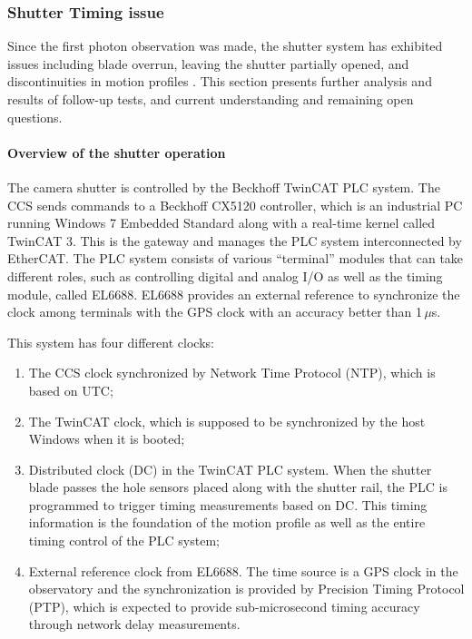 
\subsubsection{Shutter Timing issue}
\label{sec:shutter-timing}
Since the first photon observation was made, the shutter system has exhibited issues including blade overrun, leaving the shutter partially opened, and discontinuities in motion profiles \citep{CTN-003}. This section presents  further analysis and results of follow-up tests, and current understanding and remaining open questions.

\paragraph{Overview of the shutter operation}
The camera shutter is controlled by the Beckhoff TwinCAT PLC system. The CCS sends commands to a Beckhoff CX5120 controller, which is an industrial PC running Windows 7 Embedded Standard along with a real-time kernel called TwinCAT 3. This is the gateway and manages the PLC system interconnected by EtherCAT. The PLC system consists of various ``terminal'' modules that can take different roles, such as controlling digital and analog I/O as well as the timing module, called EL6688. EL6688 provides an external reference to synchronize the clock among terminals with the GPS clock with an accuracy better than 1\,$\mu$s. 

This system has four different clocks: 
\begin{enumerate}
    \item The CCS clock synchronized by Network Time Protocol (NTP), which is based on UTC;
    \item The TwinCAT clock, which is supposed to be synchronized by the host Windows when it is booted;
    \item Distributed clock (DC) in the TwinCAT PLC system. When the shutter blade passes the hole sensors placed along with the shutter rail, the PLC is programmed to trigger timing measurements based on DC. This timing information is the foundation of the motion profile as well as the entire timing control of the PLC system;
    \item External reference clock from EL6688. The time source is a GPS clock in the observatory and the synchronization is provided by Precision Timing Protocol (PTP), which is expected to provide sub-microsecond timing accuracy through network delay measurements.
\end{enumerate}

